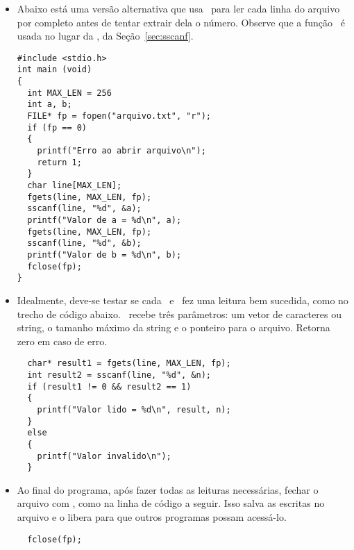 \begin{itemize}
\item Abaixo está uma versão alternativa que usa \FGETS\ para ler cada linha do arquivo por completo antes de tentar extrair dela o número. Observe que a função \FGETS\ é usada no lugar da \GETS, da Seção~\ref{sec:sscanf}. \

\begin{lstlisting}
#include <stdio.h> 
int main (void)
{
  int MAX_LEN = 256
  int a, b;
  FILE* fp = fopen("arquivo.txt", "r");
  if (fp == 0)
  {
    printf("Erro ao abrir arquivo\n");
    return 1;
  }
  char line[MAX_LEN];
  fgets(line, MAX_LEN, fp);
  sscanf(line, "%d", &a);
  printf("Valor de a = %d\n", a);
  fgets(line, MAX_LEN, fp);
  sscanf(line, "%d", &b);
  printf("Valor de b = %d\n", b);
  fclose(fp);
}
\end{lstlisting}


\item Idealmente, deve-se testar se cada \FSCANF\ e \FGETS\ fez uma leitura bem sucedida, como no trecho de código abaixo. \FGETS\ recebe três parâmetros: um vetor de caracteres ou string, o tamanho máximo da string e o ponteiro para o arquivo. Retorna zero em caso de erro.

\begin{lstlisting}
  char* result1 = fgets(line, MAX_LEN, fp);
  int result2 = sscanf(line, "%d", &n);
  if (result1 != 0 && result2 == 1)
  {
    printf("Valor lido = %d\n", result, n);
  }
  else
  {
    printf("Valor invalido\n");
  }
\end{lstlisting}

\item Ao final do programa, após fazer todas as leituras necessárias, fechar o arquivo com \FCLOSE, como na linha de código a seguir. Isso salva as escritas no arquivo e o libera para que outros programas possam acessá-lo.

\begin{lstlisting}
  fclose(fp);
\end{lstlisting}

\end{itemize}


